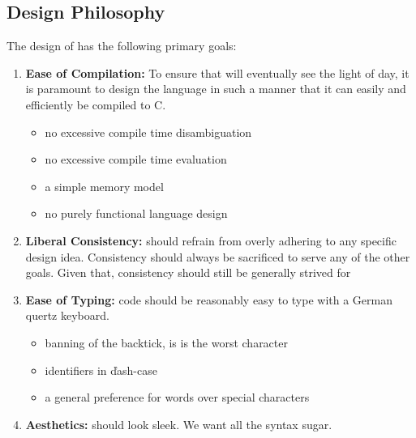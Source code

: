 \documentclass{article}
\begin{document}
\subsection{Design Philosophy}
The design of \lazydog has the following primary goals:
\begin{enumerate}
    \item {\bf Ease of Compilation:}
    To ensure that \lazydog will eventually see the light
    of day, it is paramount to design the language in such
    a manner that it can easily and efficiently be compiled
    to C.
    \begin{itemize}
        \item no excessive compile time disambiguation
        \item no excessive compile time evaluation
        \item a simple memory model
        \item no purely functional language design
    \end{itemize}
    \item {\bf Liberal Consistency:}
    \lazydog should refrain from overly adhering to any
    specific design idea. 
    Consistency should always be sacrificed to serve any
    of the other goals.
    Given that, consistency should still be generally strived for
    \item {\bf Ease of Typing:} \lazydog code should be
    reasonably easy to type with a German quertz keyboard.
    \begin{itemize}
        \item banning of the backtick, is is the worst character
        \item identifiers in \v{dash-case}
        \item a general preference for words over special characters
    \end{itemize}
    \item {\bf Aesthetics:} \lazydog should look sleek.
    We want all the syntax sugar.
    \setcounter{rememberEnumi}{\theenumi}
\end{enumerate}
\end{document}
